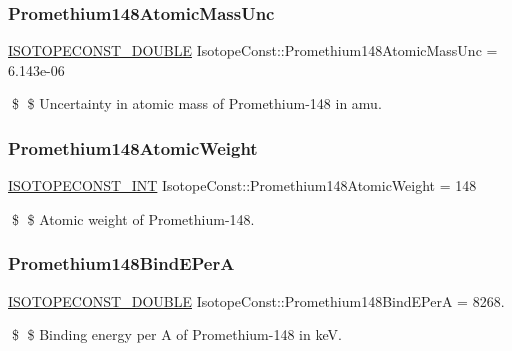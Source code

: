 \subsubsection{\texorpdfstring{Promethium148\+Atomic\+Mass\+Unc}{Promethium148AtomicMassUnc}}
{\footnotesize\ttfamily \mbox{\hyperlink{group___isotope_const-_macros_ga8f45a7272ce02c0b4c65c44636ed719a}{I\+S\+O\+T\+O\+P\+E\+C\+O\+N\+S\+T\+\_\+\+D\+O\+U\+B\+LE}} Isotope\+Const\+::\+Promethium148\+Atomic\+Mass\+Unc = 6.\+143e-\/06}

\$ \$ Uncertainty in atomic mass of Promethium-\/148 in amu. \mbox{\label{group___isotope_const-_promethium-_pm148_ga4414f73bd8c71992208e517b5ccfeec1}} 
\subsubsection{\texorpdfstring{Promethium148\+Atomic\+Weight}{Promethium148AtomicWeight}}
{\footnotesize\ttfamily \mbox{\hyperlink{group___isotope_const-_macros_ga5f18360b3e99483a35c32d789e62621c}{I\+S\+O\+T\+O\+P\+E\+C\+O\+N\+S\+T\+\_\+\+I\+NT}} Isotope\+Const\+::\+Promethium148\+Atomic\+Weight = 148}

\$ \$ Atomic weight of Promethium-\/148. \mbox{\label{group___isotope_const-_promethium-_pm148_ga79654e4fb2d87411d3a926d43e2b660a}} 
\subsubsection{\texorpdfstring{Promethium148\+Bind\+E\+PerA}{Promethium148BindEPerA}}
{\footnotesize\ttfamily \mbox{\hyperlink{group___isotope_const-_macros_ga8f45a7272ce02c0b4c65c44636ed719a}{I\+S\+O\+T\+O\+P\+E\+C\+O\+N\+S\+T\+\_\+\+D\+O\+U\+B\+LE}} Isotope\+Const\+::\+Promethium148\+Bind\+E\+PerA = 8268.}

\$ \$ Binding energy per A of Promethium-\/148 in keV. \mbox{\label{group___isotope_const-_promethium-_pm148_ga531eec8acfa84c8b072fa3b90fe8dd25}} 
